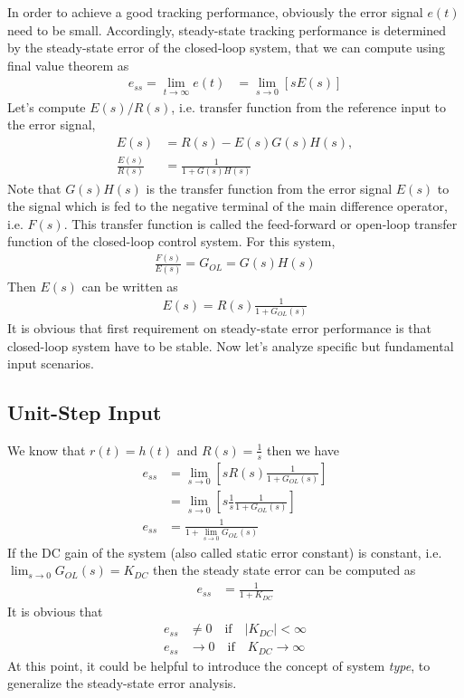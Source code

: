 \documentclass[twoside]{article}
\begin{document}
In order to achieve a good tracking performance, obviously 
the error signal $e(t)$ need to be small. Accordingly, steady-state 
tracking performance is determined by the steady-state error
of the closed-loop system, that we can compute using final
value theorem as
%
\begin{align*}
	e_{ss} = \lim_{t\to \infty} e(t) &= \lim_{s \to 0} \left[ s E(s) \right]
\end{align*}
%
Let's compute $E(s)/R(s)$, i.e. transfer function from the reference input to the 
error signal, 
%
\begin{align*}
E(s) &= R(s) - E(s) G(s) H(s)  , 
\\
\frac{E(s)}{R(s)} &= \frac{1}{1 + G(s) H(s) }
\end{align*}
%
Note that $G(s) H(s)$ is the  transfer function from the error
signal $E(s)$ to the signal which is fed to the negative terminal of 
the main difference operator, i.e. $F(s)$. This transfer function is
called the feed-forward or open-loop transfer function of the 
closed-loop control system. For this system, 
%
\begin{align*}
\frac{F(s)}{E(s)} = G_{OL} = G(s) H(s)
\end{align*}
%
Then $E(s)$ can be written as
%
\begin{align*}
E(s) = R(s) \frac{1}{1 + G_{OL} (s) }
\end{align*}
%
It is obvious that first requirement on steady-state error
performance is that closed-loop system have to be stable.
Now let's analyze specific but fundamental input scenarios. 

\subsection*{Unit-Step Input}

We know that $r(t) = h(t)$ and $R(s) = \frac{1}{s}$ then 
we have
%
\begin{align*}
e_{ss} &= \lim_{s \to 0} \left[ s R(s) \frac{1}{1
         + G_{OL} (s) } \right]
\\
&= \lim_{s \to 0} \left[ s \frac{1}{s} \frac{1}{1
         + G_{OL} (s) } \right]
\\
e_{ss} &= \frac{1}{1 + \lim_{s \to 0} G_{OL} (s) }
\end{align*}
%
If the DC gain of the system (also called static error constant) is
constant, i.e. $\lim_{s \to 0}G_{OL}(s) = K_{DC}$ then the steady state error can be
computed as
%
\begin{align*}
e_{ss} &= \frac{1}{1 + K_{DC}}
\end{align*}
%
It is obvious that 
%
\begin{align*}
e_{ss} &\neq 0 \quad \mathrm{if} \quad |K_{DC}| < \infty
\\
e_{ss} &\to 0 \quad \mathrm{if} \quad K_{DC} \to \infty
\end{align*}
%
At this point, it could be helpful to introduce the concept of system \textit{type},
to generalize the steady-state error analysis. 
\end{document}
